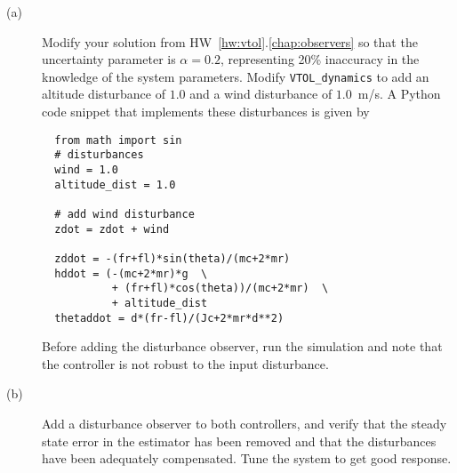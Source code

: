 \begin{description}
\item[(a)] Modify your solution from HW~\ref{hw:vtol}.\ref{chap:observers} so that the uncertainty parameter is $\alpha=0.2$, representing 20\% inaccuracy in the knowledge of the system parameters.  Modify {\tt VTOL\_dynamics} to add an altitude disturbance of $1.0$ and a wind disturbance of $1.0$~m/s.  A Python code snippet that implements these disturbances is given by
\begin{lstlisting}
  from math import sin
  # disturbances
  wind = 1.0
  altitude_dist = 1.0
  
  # add wind disturbance
  zdot = zdot + wind
  
  zddot = -(fr+fl)*sin(theta)/(mc+2*mr)
  hddot = (-(mc+2*mr)*g  \ 
           + (fr+fl)*cos(theta))/(mc+2*mr)  \ 
           + altitude_dist
  thetaddot = d*(fr-fl)/(Jc+2*mr*d**2)
\end{lstlisting}
Before adding the disturbance observer, run the simulation and note that the controller is not robust to the input disturbance.
\item[(b)] Add a disturbance observer to both controllers, and verify that the steady state error in the estimator has been removed and that the disturbances have been adequately compensated.  Tune the system to get good response.
\end{description}
